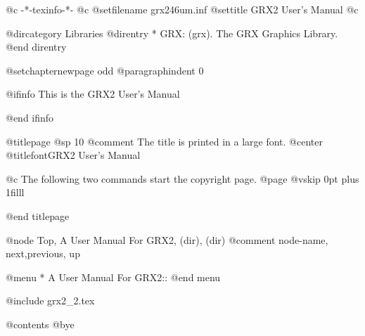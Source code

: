    @c -*-texinfo-*-
@c %
@setfilename grx246um.inf
@settitle GRX2 User's Manual
@c %

@dircategory Libraries
@direntry
* GRX: (grx).                   The GRX Graphics Library.
@end direntry

@setchapternewpage odd
@paragraphindent 0

@ifinfo
This is the GRX2 User's Manual

@end ifinfo

@titlepage
@sp 10
@comment The title is printed in a large font.
@center @titlefont{GRX2 User's Manual}

@c The following two commands start the copyright page.
@page
@vskip 0pt plus 1filll

@end titlepage


@node  Top, A User Manual For GRX2, (dir), (dir)
@comment node-name, next,previous, up

@menu
* A User Manual For GRX2::
@end menu

@include grx2_2.tex

@contents
@bye

